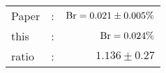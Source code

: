       \begin{tabular}{lcr}
          Paper &:& $\mathrm{Br}  = 0.021\pm 0.005\%$ \\
          this      &:& $\mathrm{Br}  = 0.024\%$ \\
		  ratio   &:& $1.136\pm 0.27$ \\
      \end{tabular}
